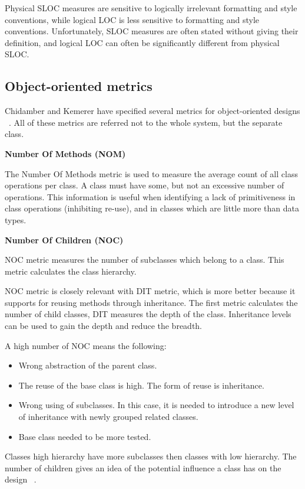 Physical SLOC measures are sensitive to logically irrelevant formatting and style conventions, while logical LOC is less sensitive to formatting and style conventions. Unfortunately, SLOC measures are often stated without giving their definition, and logical LOC can often be significantly different from physical SLOC.

\subsection{Object-oriented metrics}

Chidamber and Kemerer have specified several metrics for object-oriented designs ~\cite{ck}. All of these metrics are referred not to the whole system, but the separate class.

\textbf{Number Of Methods (NOM)}

The Number Of Methods metric is used to measure the average count of all class operations per class. A class must have some, but not an excessive number of operations. This information is useful when identifying a lack of primitiveness in class operations (inhibiting re-use), and in classes which are little more than data types.

\textbf{Number Of Children (NOC)}

NOC metric measures the number of subclasses which belong to a class. This metric calculates the class hierarchy.

NOC metric is closely relevant with DIT metric, which is more better because it supports for reusing methods through inheritance. The first metric calculates the number of child classes, DIT measures the depth of the class.
Inheritance levels can be used to gain the depth and reduce the breadth.

A high number of NOC means the following: 
\begin{itemize}
	\item Wrong abstraction of the parent class. 
	\item The reuse of the base class is high. The form of reuse is inheritance.
	\item Wrong using of subclasses. In this case, it is needed to introduce a new level of inheritance with newly grouped related classes.
	\item Base class needed to be more tested.
\end{itemize}

Classes high hierarchy have more subclasses then classes with low hierarchy. The number of children gives an idea of the potential influence a class has on the design ~\cite{ck}.


